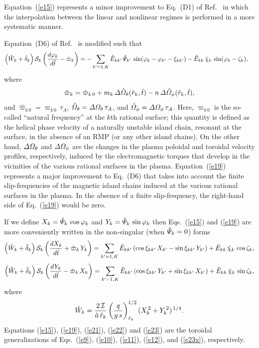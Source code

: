 \documentclass[12pt,prb,aps]{revtex4-1}
\begin{document}
Equation~(\ref{e15}) represents a minor improvement to Eq.~(D1) of Ref.~ in which the interpolation between the
linear and nonlinear regimes is performed in a more systematic manner. 

Equation~(D6) of Ref.~ is modified such that
\begin{align}\label{e19}
\left(\hat{W}_k +\hat{\delta}_k\right){\cal S}_k\left(\frac{d\varphi_k}{d\hat{t}}-\hat{\varpi}_k\right)&=
- \sum_{k'=1,K}\hat{E}_{kk'}\,\hat{\mit\Psi}_{k'}\,\sin(\varphi_k-\varphi_{k'}-\xi_{kk'})-\hat{E}_{kk}\,\hat{\chi}_k\,\sin(\varphi_k-\zeta_k),
\end{align}
where
\begin{equation}
\hat{\varpi}_k= \hat{\varpi}_{k\,0}+m_k\,{\mit\Delta}\hat{\mit\Omega}_\theta(\hat{r}_k,\hat{t})-n\,{\mit\Delta}\hat{\mit\Omega}_\phi(\hat{r}_k,\hat{t}),
\end{equation}
and $\hat{\varpi}_{k\,0}= \varpi_{k\,0}\,\tau_A$, $\hat{\mit\Omega}_\theta= {\mit\Delta}{\mit\Omega}_\theta\,\tau_A$, and $\hat{\mit\Omega}_\phi= {\mit\Delta}{\mit\Omega}_\phi\,\tau_A$. Here, $\varpi_{k\,0}$
is the so-called ``natural frequency'' at the $k$th rational surface; this quantity is defined as the helical phase velocity of a naturally unstable island chain, resonant at the surface, in the
absence of an RMP (or any other island chains). On the other hand,  ${\mit\Delta}{\mit\Omega}_\theta$ and ${\mit\Delta}{\mit\Omega}_\phi$ are the changes in the plasma
poloidal and toroidal velocity profiles, respectively, induced by the electromagnetic torques that develop in the vicinities of the various rational surfaces in the plasma.
Equation~(\ref{e19}) represents
a major improvement to Eq.~(D6) that takes into  account the finite slip-frequencies of the magnetic island chains induced at
the various rational surfaces in the plasma. In the absence of a finite slip-frequency, the right-hand side of Eq.~(\ref{e19}) would be zero. 

If we define $X_k = \hat{\mit\Psi}_k\,\cos\varphi_k$ and $Y_k=\hat{\mit\Psi}_k\,\sin\varphi_k$ then Eqs.~(\ref{e15}) and (\ref{e19}) are
more conveniently written in the non-singular (when $\hat{\mit\Psi}_k=0$) forms
\begin{align}\label{e21}
\left(\hat{W}_k +\hat{\delta}_k\right){\cal S}_k\left(\frac{dX_k}{d\hat{t}} 
+\hat{\varpi}_k\,Y_k\right)= \sum_{k'=1,K}\hat{E}_{kk'}\,(\cos\xi_{kk'}\,X_{k'}  -\sin\xi_{kk'}\,Y_{k'}) + \hat{E}_{kk}\,\hat{\chi}_k\,\cos\zeta_k,\\[0.5ex]
\left(\hat{W}_k +\hat{\delta}_k\right){\cal S}_k\left(\frac{dY_k}{d\hat{t}} -\hat{\varpi}_k\,X_k\right)
= \sum_{k'=1,K}\hat{E}_{kk'}\,(\cos\xi_{kk'}\,Y_{k'}
+\sin\xi_{kk'}\,X_{k'}) + \hat{E}_{kk}\,\hat{\chi}_k\,\sin\zeta_k,\label{e22}
\end{align}
where
\begin{equation}\label{e23}
\hat{W}_k =\frac{2\,{\cal I}}{\hat{a}\,\hat{r}_k}\left(\frac{q}{g\,s}\right)^{1/2}_{\hat{r}_k} (X_k^{\,2} + Y_k^{\,2})^{\,1/4}.
\end{equation}
Equations (\ref{e15}), (\ref{e19}), (\ref{e21}), (\ref{e22}) and (\ref{e23}) are the toroidal generalizations of Eqs.~(\ref{e9}), (\ref{e10}), (\ref{e11}), (\ref{e12}), and (\ref{e23x}), respectively.
\end{document}
